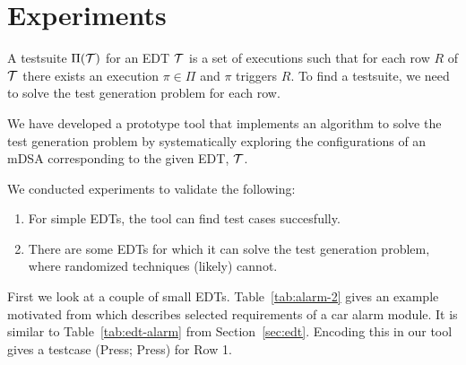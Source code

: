 \section{Experiments}
\label{sec:experiments}
A testsuite $\Pi(\mathcal{T})$ for an EDT $\mathcal{T}$ is a set of executions such
that for each row $R$ of $\mathcal{T}$ there exists an execution
$\pi \in \Pi$ and $\pi$ triggers $R$. To find a testsuite, we need to solve the test generation problem for each row.

We have developed a prototype tool that implements an
algorithm to solve the test generation problem by systematically
exploring the configurations of an mDSA corresponding to the given EDT,
$\mathcal{T}$.  %

We conducted experiments to validate the following:

\begin{enumerate}
\item For simple EDTs, the tool can find test cases succesfully.
\item There are some EDTs for which it can solve the test
  generation problem, where randomized techniques (likely) cannot.
\end{enumerate}


First we look at a couple of small EDTs. Table~\ref{tab:alarm-2} gives an example motivated from
\cite{Venkatesh:ENASE:2015} which describes selected requirements of a
car alarm module. It is similar to Table~\ref{tab:edt-alarm} from Section~\ref{sec:edt}. Encoding this in our tool gives a testcase (Press; Press) for Row 1.


